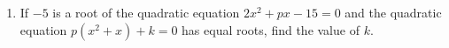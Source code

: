 \documentclass{article}
\begin{document}
\begin{enumerate}
\item If $-5$ is a root of the quadratic equation $2x^2+px-15=0$ and the quadratic equation $p(x^2+x)+k=0$ has equal roots, find the value of $k$.
\end{enumerate}
\end{document}

